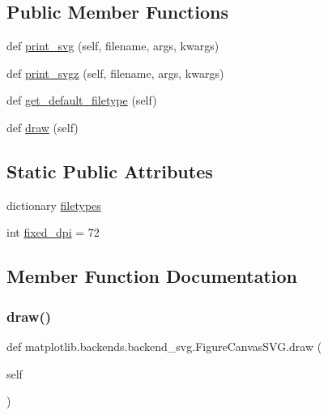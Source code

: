 \subsection*{Public Member Functions}
\begin{DoxyCompactItemize}
\item 
def \hyperlink{classmatplotlib_1_1backends_1_1backend__svg_1_1FigureCanvasSVG_a75fee70627cbfc57a8e19a0b83966e08}{print\+\_\+svg} (self, filename, args, kwargs)
\item 
def \hyperlink{classmatplotlib_1_1backends_1_1backend__svg_1_1FigureCanvasSVG_a78d76684c174c79cef536b8fa4735c2e}{print\+\_\+svgz} (self, filename, args, kwargs)
\item 
def \hyperlink{classmatplotlib_1_1backends_1_1backend__svg_1_1FigureCanvasSVG_ada9f9d35d7b5ae589c17b06c6a4c1a5b}{get\+\_\+default\+\_\+filetype} (self)
\item 
def \hyperlink{classmatplotlib_1_1backends_1_1backend__svg_1_1FigureCanvasSVG_a32273f9ae970ad2207a0758aa6eb1eac}{draw} (self)
\end{DoxyCompactItemize}
\subsection*{Static Public Attributes}
\begin{DoxyCompactItemize}
\item 
dictionary \hyperlink{classmatplotlib_1_1backends_1_1backend__svg_1_1FigureCanvasSVG_af8187efa32c9d45056fd56f5ce8e3376}{filetypes}
\item 
int \hyperlink{classmatplotlib_1_1backends_1_1backend__svg_1_1FigureCanvasSVG_aff9268a922b2086e14bf6e1675c3c45e}{fixed\+\_\+dpi} = 72
\end{DoxyCompactItemize}


\subsection{Member Function Documentation}
\mbox{\label{classmatplotlib_1_1backends_1_1backend__svg_1_1FigureCanvasSVG_a32273f9ae970ad2207a0758aa6eb1eac}} 
\subsubsection{\texorpdfstring{draw()}{draw()}}
{\footnotesize\ttfamily def matplotlib.\+backends.\+backend\+\_\+svg.\+Figure\+Canvas\+S\+V\+G.\+draw (\begin{DoxyParamCaption}\item[{}]{self }\end{DoxyParamCaption})}

